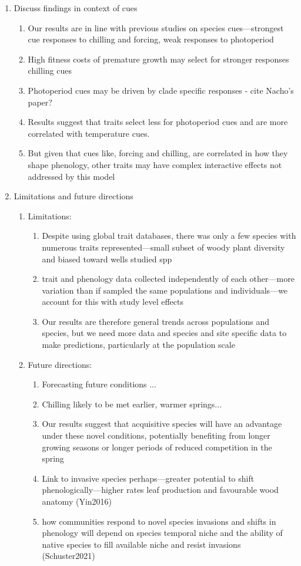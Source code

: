 \documentclass{article}
\begin{document}
\begin{enumerate}
\item Discuss findings in context of cues
\begin{enumerate}
\item Our results are in line with previous studies on species cues---strongest cue responses to chilling and forcing, weak responses to photoperiod
\item High fitness costs of premature growth may select for stronger responses chilling cues
\item Photoperiod cues may be driven by clade specific responses - cite Nacho's paper?
\item Results suggest that traits select less for photoperiod cues and are more correlated with temperature cues. 
\item But given that cues like, forcing and chilling, are correlated in how they shape phenology, other traits may have complex interactive effects not addressed by this model
\end{enumerate}

\item Limitations and future directions
\begin{enumerate}
\item Limitations:
\begin{enumerate}
\item Despite using global trait databases, there was only a few species with numerous traits represented---small subset of woody plant diversity and biased toward wells studied spp
\item trait and phenology data collected independently of each other---more variation than if sampled the same populations and individuals---we account for this with study level effects
\item Our results are therefore general trends across populations and species, but we need more data and species and site specific data to make predictions, particularly at the population scale
\end{enumerate}
\item Future directions:
\begin{enumerate}
\item Forecasting future conditions ...
\item Chilling likely to be met earlier, warmer springs...
\item Our results suggest that acquisitive species will have an advantage under these novel conditions, potentially benefiting from longer growing seasons or longer periods of reduced competition in the spring
\item Link to invasive species perhaps---greater potential to shift phenologically---higher rates leaf production and favourable wood anatomy (Yin2016)
\item how communities respond to novel species invasions and shifts in phenology will depend on species temporal niche and the ability of native species to fill available niche and resist invasions (Schuster2021)
\end{enumerate}
\end{enumerate}


\end{enumerate}
\end{document}
